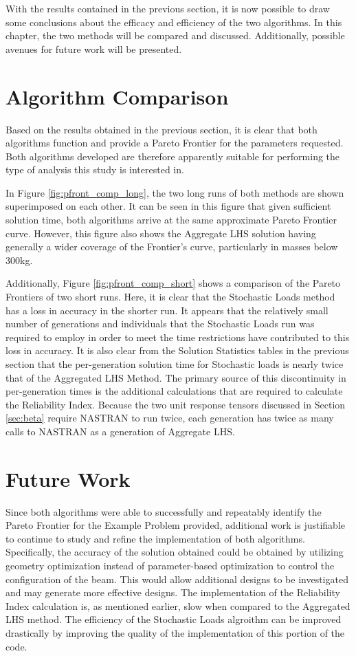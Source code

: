 With the results contained in the previous section, it is now possible to draw some conclusions about the efficacy and efficiency of the two algorithms. In this chapter, the two methods will be compared and discussed. Additionally, possible avenues for future work will be presented.  

\section{Algorithm Comparison}
Based on the results obtained in the previous section, it is clear that both algorithms function and provide a Pareto Frontier for the parameters requested. Both algorithms developed are therefore apparently suitable for performing the type of analysis this study is interested in.

In Figure \ref{fig:pfront_comp_long}, the two long runs of both methods are shown superimposed on each other. It can be seen in this figure that given sufficient solution time, both algorithms arrive at the same approximate Pareto Frontier curve. However, this figure also shows the Aggregate LHS solution having generally a wider coverage of the Frontier's curve, particularly in masses below 300kg. 

Additionally, Figure \ref{fig:pfront_comp_short} shows a comparison of the Pareto Frontiers of two short runs. Here, it is clear that the Stochastic Loads method has a loss in accuracy in the shorter run. It appears that the relatively small number of generations and individuals that the Stochastic Loads run was required to employ in order to meet the time restrictions have contributed to this loss in accuracy. It is also clear from the Solution Statistics tables in the previous section that the per-generation solution time for Stochastic loads is nearly twice that of the Aggregated LHS Method. The primary source of this discontinuity in per-generation times is the additional calculations that are required to calculate the Reliability Index. Because the two unit response tensors discussed in Section \ref{sec:beta} require NASTRAN to run twice, each generation has twice as many calls to NASTRAN as a generation of Aggregate LHS. 

\section{Future Work}
Since both algorithms were able to successfully and repeatably identify the Pareto Frontier for the Example Problem provided, additional work is justifiable to continue to study and refine the implementation of both algorithms. Specifically, the accuracy of the solution obtained could be obtained by utilizing geometry optimization instead of parameter-based optimization to control the configuration of the beam. This would allow additional designs to be investigated and may generate more effective designs. The implementation of the Reliability Index calculation is, as mentioned earlier, slow when compared to the Aggregated LHS method. The efficiency of the Stochastic Loads algroithm can be improved drastically by improving the quality of the implementation of this portion of the code. 
